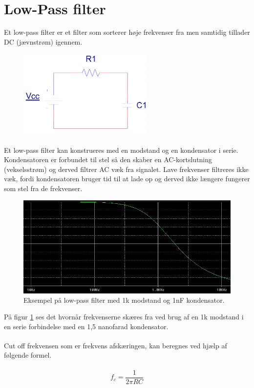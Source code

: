\section{Low-Pass filter}
\label{lowPassFilter}

Et low-pass filter er et filter som sorterer høje frekvenser fra men samtidig tillader DC (jævnstrøm) igennem.

\begin{figure}[h!]
  \centering
  \includegraphics[width=0.6\textwidth]{figures/low_pass_schematic.png}
\end{figure}

Et low-pass filter kan konstrueres med en modstand og en kondensator i serie. Kondensatoren er forbundet til stel så den skaber en AC-kortslutning (vekselsstrøm) og derved filtrer AC væk fra signalet. 
Lave frekvenser filtreres ikke væk, fordi kondensatoren bruger tid til at lade op og derved ikke længere fungerer som stel fra de frekvenser.

\begin{figure}[h!]
  \centering
  \includegraphics[width=1.0\textwidth]{figures/low_pass_cut_off_frequency1k_150nF.png}
  \caption{Eksempel på low-pass filter med 1k modstand og 1nF kondensator.}
  \label{low_pass}
\end{figure}

På figur \ref{low_pass} ses det hvornår frekvenserne skæres fra ved brug af en 1k modstand i en serie forbindelse med en 1,5 nanofarad kondensator.
\\
\\ 
Cut off frekvensen som er frekvens afskæringen, kan beregnes ved hjælp af følgende formel. 
\\
\\
\begin{equation}
f_{c}=\frac{1}{2\pi R C }
\label{lowPassEquation}
\end{equation}
\\
\\
